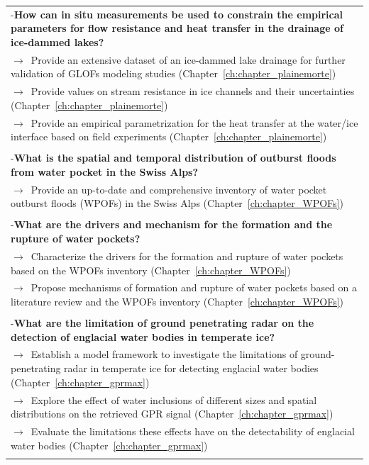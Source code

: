 \begin{longtable}{ |p{}| }
-\textbf{How can in situ measurements be used to constrain the empirical parameters for flow resistance and heat transfer in the drainage of ice-dammed lakes?}\\
$\rightarrow$\ Provide an extensive dataset of an ice-dammed lake drainage for further validation of GLOFs modeling studies (Chapter~\ref{ch:chapter_plainemorte})\\
$\rightarrow$\ Provide values on stream resistance in ice channels and their uncertainties (Chapter~\ref{ch:chapter_plainemorte}) \\
$\rightarrow$\ Provide an empirical parametrization for the heat transfer at the water/ice interface based on field experiments (Chapter~\ref{ch:chapter_plainemorte}) \\
\\

-\textbf{What is the spatial and temporal distribution of outburst floods from water pocket in the Swiss Alps?}\\
$\rightarrow$\ Provide an up-to-date and comprehensive inventory of water pocket outburst floods (WPOFs) in the Swiss Alps (Chapter~\ref{ch:chapter_WPOFs}) \\
\\

-\textbf{What are the drivers and mechanism for the formation and the rupture of water pockets?}\\
$\rightarrow$\ Characterize the drivers for the formation and rupture of water pockets based on the WPOFs inventory (Chapter~\ref{ch:chapter_WPOFs}) \\
$\rightarrow$\ Propose mechanisms of formation and rupture of water pockets based on a literature review and the WPOFs inventory (Chapter~\ref{ch:chapter_WPOFs}) \\
\\

-\textbf{What are the limitation of ground penetrating radar on the detection of englacial water bodies in temperate ice?}\\
$\rightarrow$\ Establish a model framework to investigate the limitations of ground-penetrating radar in temperate ice for detecting englacial water bodies (Chapter~\ref{ch:chapter_gprmax})\\
$\rightarrow$\ Explore the effect of water inclusions of different sizes and spatial distributions on the retrieved GPR signal (Chapter~\ref{ch:chapter_gprmax})\\
$\rightarrow$\ Evaluate the limitations these effects have on the detectability of englacial water bodies (Chapter~\ref{ch:chapter_gprmax})\\

\hline
\label{table_GLOFs_research_gaps}
\end{longtable}



